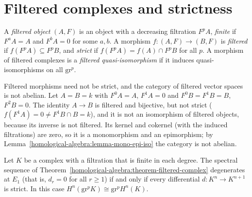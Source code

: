 \section{Filtered complexes and strictness}\label{homological-algebra:section-filtered}

\begin{definition}\label{homological-algebra:definition-strict}
A \emph{filtered object} $(A, F)$ is an object with a decreasing filtration $F^pA$, \emph{finite} if $F^aA = A$ and $F^bA = 0$ for some $a, b$. A
morphism $f \colon (A, F) \to (B, F)$ is \emph{filtered} if $f(F^pA) \subseteq F^pB$, and \emph{strict} if $f(F^pA) = f(A) \cap F^pB$ for all $p$. A
morphism of filtered complexes is a \emph{filtered quasi-isomorphism} if it induces quasi-isomorphisms on all $\mathrm{gr}^p$.
\end{definition}

\begin{counterexample}\label{homological-algebra:counterexample-not-strict}
Filtered morphisms need not be strict, and the category of filtered vector spaces is not abelian. Let $A = B = k$ with $F^0A = A$, $F^1A = 0$ and
$F^0B = F^1B = B$, $F^2B = 0$. The identity $A \to B$ is filtered and bijective, but not strict ($f(F^1A) = 0 \neq F^1B \cap B = k$), and it is not an
isomorphism of filtered objects, because its inverse is not filtered. Its kernel and cokernel (with the induced filtrations) are zero, so it is a
monomorphism and an epimorphism; by Lemma~\ref{homological-algebra:lemma-mono-epi-iso} the category is not abelian.
\end{counterexample}

\begin{proposition}[Deligne]\label{homological-algebra:proposition-degeneration-strictness}
Let $K$ be a complex with a filtration that is finite in each degree. The spectral sequence of
Theorem~\ref{homological-algebra:theorem-filtered-complex} degenerates at $E_1$ (that is, $d_r = 0$ for all $r \geq 1$) if and only if every
differential $d \colon K^n \to K^{n+1}$ is strict. In this case $H^n(\mathrm{gr}^pK) \cong \mathrm{gr}^pH^n(K)$.
\end{proposition}


